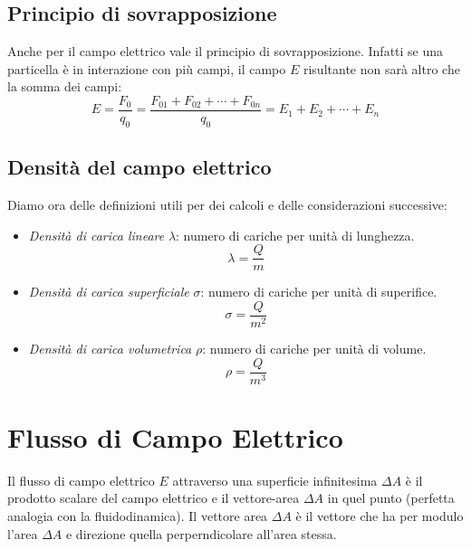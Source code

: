             \subsection{Principio di sovrapposizione} Anche per il campo 
            elettrico vale il principio di sovrapposizione. Infatti se una 
            particella è in interazione con più campi, il campo $E$ risultante
            non sarà altro che la somma dei campi:
                \begin{equation}
                    E = \frac{F_0}{q_0} = \frac{F_{01} + F_{02} + \cdots + 
                    F_{0n}}{q_0} = E_1 + E_2 + \cdots + E_n
                \end{equation}

            \subsection{Densità del campo elettrico} Diamo 
            ora delle definizioni utili per dei calcoli e delle considerazioni
            successive:
            \begin{itemize}
                \item \textit{Densità di carica lineare} $\lambda$: numero di 
                cariche per unità di lunghezza.\\
                    \begin{equation}
                        \lambda = \frac{Q}{m}
                    \end{equation}
                \item \textit{Densità di carica superficiale} $\sigma$: numero 
                di cariche per unità di superifice.\\
                    \begin{equation}
                        \sigma = \frac{Q}{m^2}
                    \end{equation}
                \item \textit{Densità di carica volumetrica} $\rho$: numero
                di cariche per unità di volume.\\
                    \begin{equation}
                        \rho = \frac{Q}{m^3}
                    \end{equation}
            \end{itemize}

        \section{Flusso di Campo Elettrico} Il flusso di campo elettrico $E$ 
        attraverso una superficie infinitesima $\Delta A$ è il prodotto scalare
        del campo elettrico e il vettore-area $\Delta A$ in quel punto 
        (perfetta analogia con la fluidodinamica). Il vettore area $\Delta A$ è
        il vettore che ha per modulo l'area $\Delta A$ e direzione quella 
        perperndicolare all'area stessa.
